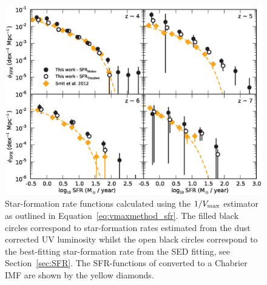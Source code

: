 \begin{figure}
\centering
\includegraphics[width=\textwidth]{plots/fig14.eps}
\caption{Star-formation rate functions calculated using the $1/V_{\rm{max}}$ estimator as outlined in Equation~\ref{eq:vmaxmethod_sfr}. The filled black circles correspond to star-formation rates estimated from the dust corrected UV luminosity whilst the open black circles correspond to the best-fitting star-formation rate from the SED fitting, see Section~\ref{sec:SFR}. The SFR-functions of \citet{Smit:2012is} converted to a Chabrier IMF are shown by the yellow diamonds.}
\label{fig:sfr_function}
\end{figure}

